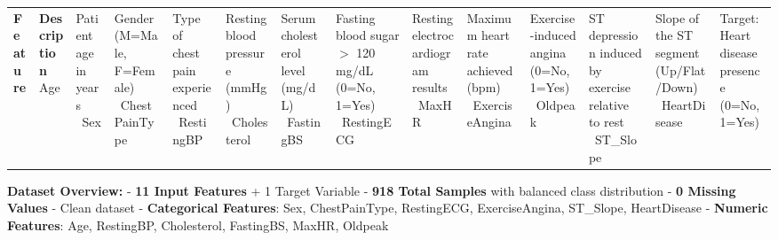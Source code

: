 \documentclass[11pt]{article}
\begin{document}
{\def\LTcaptype{none} %
\begin{longtable}[]{@{}p{3cm}p{10cm}@{}}
\toprule\noalign{}
\textbf{Feature} & \textbf{Description} \
\midrule\noalign{}
\endhead
\bottomrule\noalign{}
\endlastfoot
Age & Patient age in years \
Sex & Gender (M=Male, F=Female) \
ChestPainType & Type of chest pain experienced \
RestingBP & Resting blood pressure (mmHg) \
Cholesterol & Serum cholesterol level (mg/dL) \
FastingBS & Fasting blood sugar $>$ 120 mg/dL (0=No, 1=Yes) \
RestingECG & Resting electrocardiogram results \
MaxHR & Maximum heart rate achieved (bpm) \
ExerciseAngina & Exercise-induced angina (0=No, 1=Yes) \
Oldpeak & ST depression induced by exercise relative to rest \
ST\_Slope & Slope of the ST segment (Up/Flat/Down) \
HeartDisease & Target: Heart disease presence (0=No, 1=Yes) \
\end{longtable}
}

\textbf{Dataset Overview:} - \textbf{11 Input Features} + 1 Target
Variable - \textbf{918 Total Samples} with balanced class distribution -
\textbf{0 Missing Values} - Clean dataset - \textbf{Categorical
Features}: Sex, ChestPainType, RestingECG, ExerciseAngina, ST\_Slope,
HeartDisease - \textbf{Numeric Features}: Age, RestingBP, Cholesterol,
FastingBS, MaxHR, Oldpeak
\end{document}
